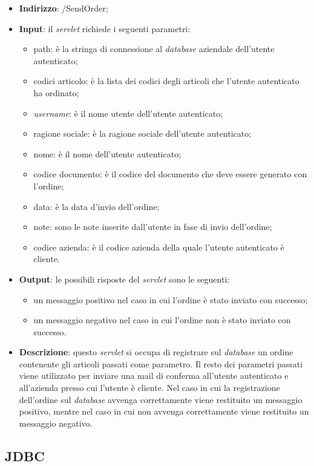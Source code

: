 \begin{itemize}
	\item \textbf{Indirizzo}: /SendOrder;
	\item \textbf{Input}: il \textit{servlet} richiede i seguenti parametri:
		\begin{itemize}
			\item path: è la stringa di connessione al \textit{database} aziendale dell'utente autenticato;
			\item codici articolo: è la lista dei codici degli articoli che l'utente autenticato ha ordinato;
			\item \textit{username}: è il nome utente dell'utente autenticato;
			\item ragione sociale: è la ragione sociale dell'utente autenticato;
			\item nome: è il nome dell'utente autenticato;
			\item codice documento: è il codice del documento che deve essere generato con l'ordine;
			\item data: è la data d'invio dell'ordine;
			\item note: sono le note inserite dall'utente in fase di invio dell'ordine;
			\item codice azienda: è il codice azienda della quale l'utente autenticato è cliente.
		\end{itemize}
	\item \textbf{Output}: le possibili risposte del \textit{servlet} sono le seguenti:
		\begin{itemize}
			\item un messaggio positivo nel caso in cui l'ordine è stato inviato con successo;
			\item un messaggio negativo nel caso in cui l'ordine non è stato inviato con successo.
		\end{itemize}
	\item \textbf{Descrizione}: questo \textit{servlet} si occupa di registrare sul \textit{database} un ordine contenente gli articoli passati come parametro. Il resto dei parametri passati viene utilizzato per inviare una mail di conferma all'utente autenticato e all'azienda presso cui l'utente è cliente. Nel caso in cui la registrazione dell'ordine sul \textit{database} avvenga correttamente viene restituito un messaggio positivo, mentre nel caso in cui non avvenga correttamente viene restituito un messaggio negativo.
\end{itemize}

\subsection{JDBC}

